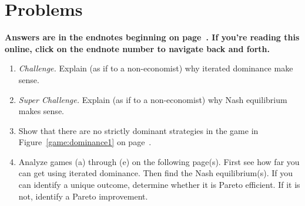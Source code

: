 \bigskip
\bigskip
\section*{Problems}

\noindent \textbf{Answers are in the endnotes beginning on page~\pageref{2nasha}. If you're reading this online, click on the endnote number to navigate back and forth.}

\begin{enumerate}


\item \emph{Challenge.} Explain (as if to a non-economist) why iterated dominance make sense.






\item \emph{Super Challenge.} Explain (as if to a non-economist) why Nash equilibrium makes sense.







\item Show that there are no strictly dominant strategies in the game in Figure~\ref{game:dominance1} on page~\pageref{game:dominance1}.








\item Analyze games (a) through (e) on the following page(s). First see how far you can get using iterated dominance. Then find the Nash equilibrium(s). If you can identify a unique outcome, determine whether it is Pareto efficient. If it is not, identify a Pareto improvement.
%


\end{enumerate}
